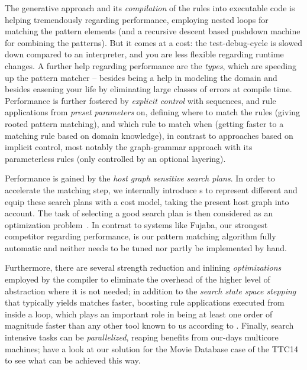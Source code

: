 The generative approach and its \emph{compilation} of the rules into executable code is helping tremendously regarding performance, employing nested loops for matching the pattern elements (and a recursive descent based pushdown machine for combining the patterns).
But it comes at a cost: the test-debug-cycle is slowed down compared to an interpreter, and you are less flexible regarding runtime changes.
A further help regarding performance are the \emph{types}, which are speeding up the pattern matcher
-- besides being a help in modeling the domain and besides easening your life by eliminating large classes of errors at compile time.
Performance is further fostered by \emph{explicit control} with sequences, and rule applications from \emph{preset parameters} on, defining where to match the rules (giving rooted pattern matching), and which rule to match when (getting faster to a matching rule based on domain knowledge), in contrast to approaches based on implicit control, most notably the graph-grammar approach with its parameterless rules (only controlled by an optional layering). 

Performance is gained by the \emph{host graph sensitive search plans}.
In order to accelerate the matching step, we internally introduce s
to represent different  and equip these search plans with a cost model, taking the present host graph into account.
The task of selecting a good search plan is then considered as an optimization problem~\cite{BKG:07,Bat:06}.
In contrast to systems like Fujaba\cite{fujaba,fuj}, our strongest competitor regarding performance,
is our pattern matching algorithm fully automatic and neither needs to be tuned nor partly be implemented by hand.

Furthermore, there are several strength reduction and inlining \emph{optimizations} employed by the compiler to eliminate the overhead of the higher level of abstraction where it is not needed;
in addition to the \emph{search state space stepping} that typically yields matches faster,
boosting rule applications executed from inside a loop,
which plays an important role in being at least one order of magnitude faster than any other tool known to us according to \cite{varro_bench}.
Finally, search intensive tasks can be \emph{parallelized}, reaping benefits from our-days multicore machines; have a look at our solution for the Movie Database case of the TTC14\cite{MovieDatabase} to see what can be achieved this way.

